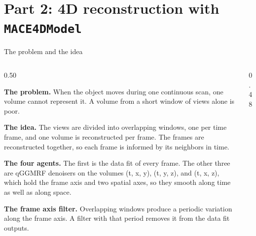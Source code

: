 \documentclass[aspectratio=169,10pt]{beamer}
\newcommand{\tagchip}[2]{{\setlength{\fboxsep}{2.5pt}\setlength{\fboxrule}{0.6pt}%
  \fcolorbox{white}{#1}{\textcolor{white}{\footnotesize\bfseries\strut #2}}}}
\newcommand{\fourdchip}{\tagchip{safeGreen}{MACE4D}}
\newcommand{\head}[1]{\textbf{#1}}
\begin{document}
\section{Part 2: 4D reconstruction with \texttt{MACE4DModel}}

\begin{frame}{The problem and the idea \hfill \fourdchip}
  \begin{columns}[T]
    \begin{column}{0.50\textwidth}
      {\footnotesize
      \head{The problem.}  When the object moves during one continuous
      scan, one volume cannot represent it.  A volume from a short window
      of views alone is poor.\par\vspace{5pt}
      \head{The idea.}  The views are divided into overlapping windows,
      one per time frame, and one volume is reconstructed per frame.  The
      frames are reconstructed together, so each frame is informed by its
      neighbors in time.\par\vspace{5pt}
      \head{The four agents.}  The first is the data fit of every frame.
      The other three are qGGMRF denoisers on the volumes (t, x, y),
      (t, y, z), and (t, x, z), which hold the frame axis and two spatial
      axes, so they smooth along time as well as along
      space.\par\vspace{5pt}
      \head{The frame axis filter.}  Overlapping windows produce a periodic
      variation along the frame axis.  A filter with that period removes
      it from the data fit outputs.\par}
    \end{column}
    \begin{column}{0.48\textwidth}
      \centering
\end{column}
\end{columns}
\end{frame}
\end{document}
